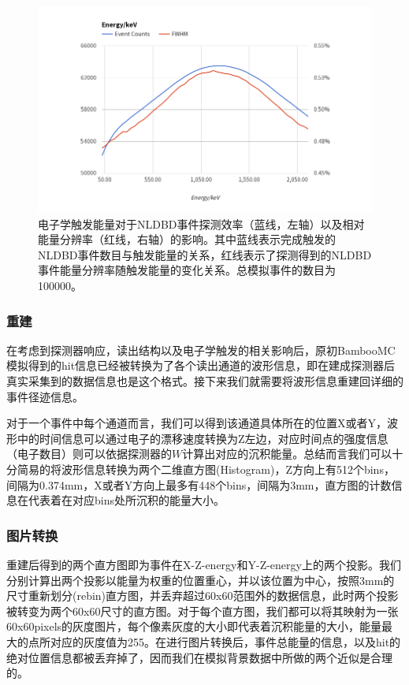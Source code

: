     \begin{figure}
        \centering
        \includegraphics[width=0.8\columnwidth]{pic/trigger_select.png}
        \caption{电子学触发能量对于NLDBD事件探测效率（蓝线，左轴）以及相对能量分辨率（红线，右轴）的影响。其中蓝线表示完成触发的NLDBD事件数目与触发能量的关系，红线表示了探测得到的NLDBD事件能量分辨率随触发能量的变化关系。总模拟事件的数目为100000。}
        \label{fig:trigger_select}
    \end{figure}

\subsubsection{重建}

    在考虑到探测器响应，读出结构以及电子学触发的相关影响后，原初BambooMC模拟得到的hit信息已经被转换为了各个读出通道的波形信息，即在建成探测器后真实采集到的数据信息也是这个格式。接下来我们就需要将波形信息重建回详细的事件径迹信息。

    对于一个事件中每个通道而言，我们可以得到该通道具体所在的位置X或者Y，波形中的时间信息可以通过电子的漂移速度转换为Z左边，对应时间点的强度信息（电子数目）则可以依据探测器的$W$计算出对应的沉积能量。总结而言我们可以十分简易的将波形信息转换为两个二维直方图(Histogram)，Z方向上有512个bins，间隔为0.374mm，X或者Y方向上最多有448个bins，间隔为3mm，直方图的计数信息在代表着在对应bins处所沉积的能量大小。

\subsubsection{图片转换}
    重建后得到的两个直方图即为事件在X-Z-energy和Y-Z-energy上的两个投影。我们分别计算出两个投影以能量为权重的位置重心，并以该位置为中心，按照3mm的尺寸重新划分(rebin)直方图，并丢弃超过60x60范围外的数据信息，此时两个投影被转变为两个60x60尺寸的直方图。对于每个直方图，我们都可以将其映射为一张60x60pixels的灰度图片，每个像素灰度的大小即代表着沉积能量的大小，能量最大的点所对应的灰度值为255。在进行图片转换后，事件总能量的信息，以及hit的绝对位置信息都被丢弃掉了，因而我们在模拟背景数据中所做的两个近似是合理的。

